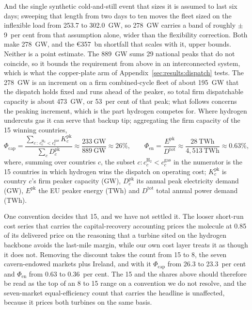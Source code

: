 And the single synthetic cold-and-still event that sizes it is assumed to last six days;
sweeping that length from two days to ten moves the fleet sized on the inflexible load from 253.7 to
302.0~GW, so 278~GW carries a band of roughly $\pm$9~per cent from that assumption
alone, wider than the flexibility correction. Both make 278~GW, and the
\euro{}357~bn shortfall that scales with it, upper bounds. Neither is a point
estimate. The 889~GW sums 29
national peaks that do not coincide, so it bounds the requirement from above in an interconnected system, which is what the
copper-plate arm of Appendix~\ref{sec:results:dispatch} tests. The 278~GW is an
increment on a firm combined-cycle fleet of about 195~GW that the dispatch holds fixed
and runs ahead of the peaker, so total firm dispatchable capacity is about 473~GW, or
53~per cent of that peak; what follows concerns the peaking increment, which is the part
hydrogen competes for. Where hydrogen undercuts gas it can serve that backup tip;
aggregating the firm capacity of the 15 winning countries,
\begin{equation}
    \Phi_{\text{cap}}
    = \frac{\sum_{c\,:\,c^{\text{H}_2}_c < c^{\text{gas}}_c} K_c^{\text{pk}}}
           {\sum_c D_c^{\text{pk}}}
    \approx \frac{233~\text{GW}}{889~\text{GW}} \approx 26\%,
    \qquad
    \Phi_{\text{en}} = \frac{E^{\text{pk}}}{D^{\text{tot}}}
    \approx \frac{28~\text{TWh}}{4{,}513~\text{TWh}} \approx 0.63\%,
    \label{eq:share}
\end{equation}
where, summing over countries $c$, the subset $c:c^{\text{H}_2}_c < c^{\text{gas}}_c$ in
the numerator is the 15 countries in which hydrogen wins the dispatch on operating cost;
$K_c^{\text{pk}}$ is country $c$'s firm peaker capacity (GW), $D_c^{\text{pk}}$ its
annual peak electricity demand (GW), $E^{\text{pk}}$ the EU peaker energy (TWh) and
$D^{\text{tot}}$ total annual power demand (TWh).

One convention decides that 15, and we
have not settled it. The looser short-run cost series that carries the capital-recovery
accounting prices the molecule at 0.85 of its delivered price on the reasoning that a
turbine sited on the hydrogen backbone avoids the last-mile margin, while our own cost
layer treats it as though it does not. Removing the discount takes the count from 15 to 8, the seven cavern-endowed markets
plus Ireland, and with it $\Phi_{\text{cap}}$
from 26.3 to 23.3~per cent and $\Phi_{\text{en}}$ from 0.63 to 0.36~per cent. The 15 and
the shares above should therefore be read as the top of an 8 to 15 range on a convention
we do not resolve, and the seven-market equal-efficiency count that carries the headline
is unaffected, because it prices both turbines on the same basis.

